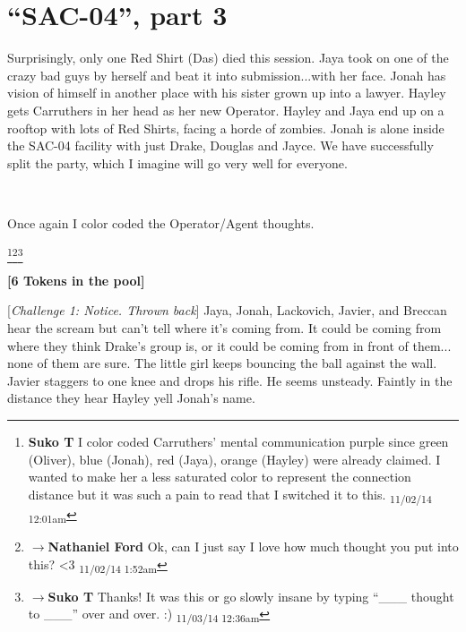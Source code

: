 \setcounter{chapter}{ 34 }
\chapter{\textbf{``SAC-04'', part 3} }









Surprisingly, only one Red Shirt (Das) died this session.  Jaya took on one of the crazy bad guys by herself and beat it into submission...with her face.  Jonah has vision of himself in another place with his sister grown up into a lawyer.  Hayley gets Carruthers in her head as her new Operator.  Hayley and Jaya end up on a rooftop with lots of Red Shirts, facing a horde of zombies.  Jonah is alone inside the SAC-04 facility with just Drake, Douglas and Jayce.  We have successfully split the party, which I imagine will go very well for everyone.


{\parskip=0pt
~

Once again I color coded the Operator/Agent thoughts.




   {\color[RGB]{153,0,255} } \footnote{\textbf{Suko T }I color coded Carruthers' mental communication purple since green (Oliver), blue (Jonah), red (Jaya), orange (Hayley) were already claimed.  I wanted to make her a less saturated color to represent the connection distance but it was such a pain to read that I switched it to this. \textsubscript{11/02/14 12:01am}}\footnote{$\rightarrow$\textbf{Nathaniel Ford }Ok, can I just say I love how much thought you put into this? \textless 3 \textsubscript{11/02/14 1:52am}}\footnote{$\rightarrow$\textbf{Suko T }Thanks!  It was this or go slowly insane by typing ``\_\_\_ thought to \_\_\_'' over and over. :) \textsubscript{11/03/14 12:36am}}
}





\textbf{{[}6 Tokens in the pool{]}}

{[}\textit{Challenge 1: Notice.  Thrown back}{]} Jaya, Jonah, Lackovich, Javier, and Breccan hear the scream but can't tell where it's coming from.  It could be coming from where they think Drake's group is, or it could be coming from in front of them... none of them are sure.  The little girl keeps bouncing the ball against the wall.  Javier staggers to one knee and drops his rifle.  He seems unsteady.  Faintly in the distance they hear Hayley yell Jonah's name.



